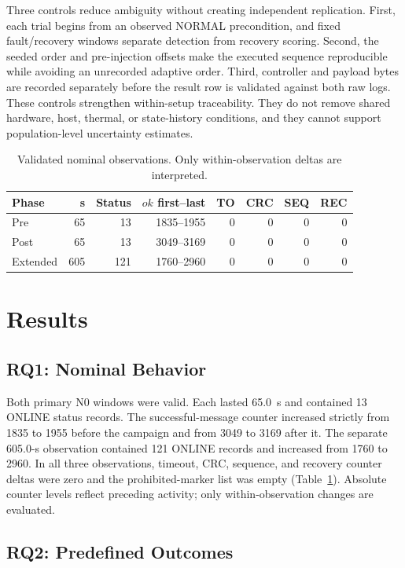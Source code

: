 \documentclass[conference]{IEEEtran}
\begin{document}
Three controls reduce ambiguity without creating independent replication. First, each trial begins from an observed NORMAL precondition, and fixed fault/recovery windows separate detection from recovery scoring. Second, the seeded order and pre-injection offsets make the executed sequence reproducible while avoiding an unrecorded adaptive order. Third, controller and payload bytes are recorded separately before the result row is validated against both raw logs. These controls strengthen within-setup traceability. They do not remove shared hardware, host, thermal, or state-history conditions, and they cannot support population-level uncertainty estimates.

\begin{table}[t]
\caption{Validated nominal observations. Only within-observation deltas are interpreted.}
\label{tab:n0}
\centering
\scriptsize
\setlength{\tabcolsep}{3.5pt}
\begin{tabular}{lrrrrrrr}
\toprule
Phase & s & Status & $ok$ first--last & TO & CRC & SEQ & REC \\
\midrule
Pre  & 65 & 13 & 1835--1955 & 0 & 0 & 0 & 0 \\
Post & 65 & 13 & 3049--3169 & 0 & 0 & 0 & 0 \\
Extended & 605 & 121 & 1760--2960 & 0 & 0 & 0 & 0 \\
\bottomrule
\end{tabular}
\end{table}

\section{Results}

\subsection{RQ1: Nominal Behavior}

Both primary N0 windows were valid. Each lasted 65.0~s and contained 13 ONLINE status records. The successful-message counter increased strictly from 1835 to 1955 before the campaign and from 3049 to 3169 after it. The separate 605.0-s observation contained 121 ONLINE records and increased from 1760 to 2960. In all three observations, timeout, CRC, sequence, and recovery counter deltas were zero and the prohibited-marker list was empty (Table~\ref{tab:n0}). Absolute counter levels reflect preceding activity; only within-observation changes are evaluated.

\subsection{RQ2: Predefined Outcomes}
\end{document}
